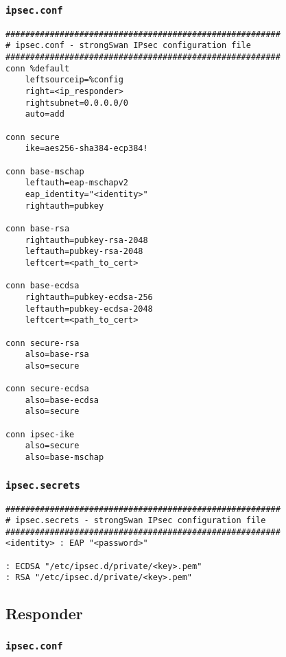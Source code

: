 \documentclass[
10pt, %
a4paper, %
oneside, %
headinclude,footinclude, %
BCOR5mm, %
]{scrartcl}
\begin{document}
\subsubsection*{\lstinline|ipsec.conf|}
\begin{lstlisting}
########################################################
# ipsec.conf - strongSwan IPsec configuration file
########################################################
conn %default
    leftsourceip=%config
    right=<ip_responder>
    rightsubnet=0.0.0.0/0
    auto=add

conn secure
    ike=aes256-sha384-ecp384!

conn base-mschap
    leftauth=eap-mschapv2
    eap_identity="<identity>"
    rightauth=pubkey

conn base-rsa
    rightauth=pubkey-rsa-2048
    leftauth=pubkey-rsa-2048
    leftcert=<path_to_cert>

conn base-ecdsa
    rightauth=pubkey-ecdsa-256
    leftauth=pubkey-ecdsa-2048
    leftcert=<path_to_cert>

conn secure-rsa
    also=base-rsa
    also=secure

conn secure-ecdsa
    also=base-ecdsa
    also=secure

conn ipsec-ike
    also=secure
    also=base-mschap
\end{lstlisting}
\newpage

\subsubsection*{\lstinline|ipsec.secrets|}
\begin{lstlisting}
########################################################
# ipsec.secrets - strongSwan IPsec configuration file
########################################################
<identity> : EAP "<password>"

: ECDSA "/etc/ipsec.d/private/<key>.pem"
: RSA "/etc/ipsec.d/private/<key>.pem"

\end{lstlisting}

\subsection{Responder}

\subsubsection*{\lstinline|ipsec.conf|}
\end{document}
